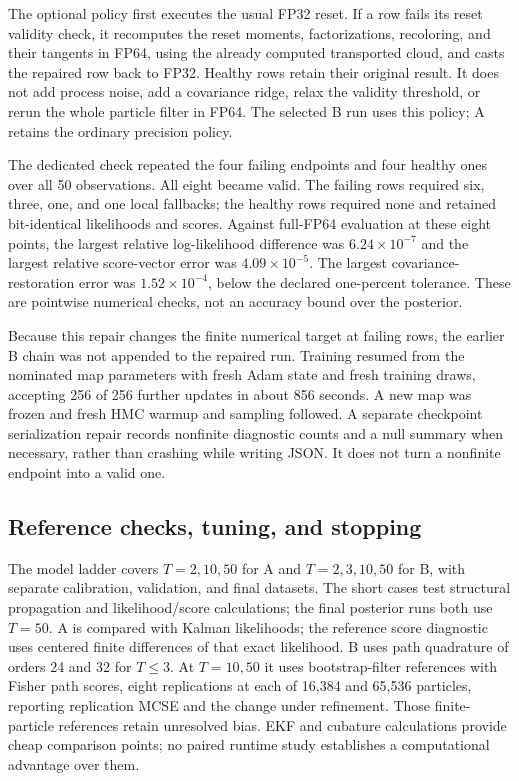 The optional  policy first executes the usual FP32
reset.  If a row fails its reset validity check, it recomputes the reset
moments, factorizations, recoloring, and their tangents in FP64, using the
already computed transported cloud, and casts the repaired row back to FP32.
Healthy rows retain their original result.  It does not add process noise,
add a covariance ridge, relax the validity threshold, or rerun the whole
particle filter in FP64.  The selected B run uses this policy; A retains the
ordinary precision policy.

The dedicated check repeated the four failing endpoints and four healthy
ones over all 50 observations.  All eight became valid.  The failing rows
required six, three, one, and one local fallbacks; the healthy rows required
none and retained bit-identical likelihoods and scores.  Against full-FP64
evaluation at these eight points, the largest relative log-likelihood
difference was $6.24\times10^{-7}$ and the largest relative score-vector
error was $4.09\times10^{-5}$.  The largest covariance-restoration error was
$1.52\times10^{-4}$, below the declared one-percent tolerance.  These are
pointwise numerical checks, not an accuracy bound over the posterior.

Because this repair changes the finite numerical target at failing rows,
the earlier B chain was not appended to the repaired run.  Training resumed
from the nominated map parameters with fresh Adam state and fresh training
draws, accepting 256 of 256 further updates in about 856 seconds.  A new map
was frozen and fresh HMC warmup and sampling followed.  A separate checkpoint
serialization repair records nonfinite diagnostic counts and a null summary
when necessary, rather than crashing while writing JSON.  It does not turn
a nonfinite endpoint into a valid one.

\subsection{Reference checks, tuning, and stopping}

The model ladder covers $T=2,10,50$ for A and $T=2,3,10,50$ for B, with
separate calibration, validation, and final datasets.  The short cases test
structural propagation and likelihood/score calculations; the final posterior
runs both use $T=50$.  A is compared with Kalman likelihoods; the reference
score diagnostic uses centered finite differences of that exact likelihood.
B uses path quadrature of orders 24 and 32 for $T\leq3$.  At $T=10,50$ it
uses bootstrap-filter references with Fisher path scores, eight replications
at each of 16,384 and 65,536 particles, reporting replication MCSE and the
change under refinement.  Those finite-particle references retain unresolved
bias.  EKF and cubature calculations provide cheap comparison points; no
paired runtime study establishes a computational advantage over them.


